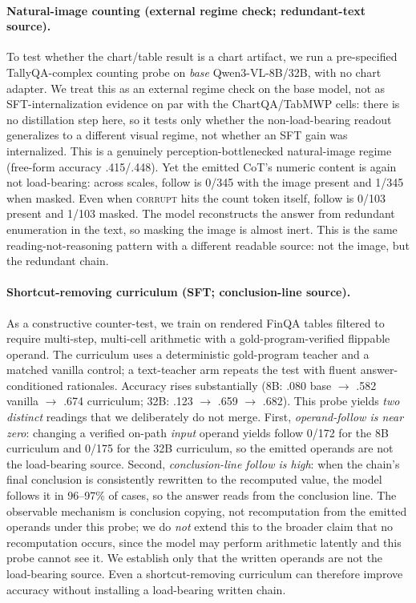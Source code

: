 \documentclass[11pt]{article}
\newcommand{\corrupt}{\textsc{corrupt}}
\begin{document}
\paragraph{Natural-image counting (external regime check; redundant-text source).}
To test whether the chart/table result is a chart artifact, we run a pre-specified TallyQA-complex counting probe on \emph{base} Qwen3-VL-8B/32B, with no chart adapter. We treat this as an external regime check on the base model, not as SFT-internalization evidence on par with the ChartQA/TabMWP cells: there is no distillation step here, so it tests only whether the non-load-bearing readout generalizes to a different visual regime, not whether an SFT gain was internalized. This is a genuinely perception-bottlenecked natural-image regime (free-form accuracy .415/.448). Yet the emitted CoT's numeric content is again not load-bearing: across scales, follow is 0/345 with the image present and 1/345 when masked. Even when \corrupt{} hits the count token itself, follow is 0/103 present and 1/103 masked. The model reconstructs the answer from redundant enumeration in the text, so masking the image is almost inert. This is the same reading-not-reasoning pattern with a different readable source: not the image, but the redundant chain.

\paragraph{Shortcut-removing curriculum (SFT; conclusion-line source).}
As a constructive counter-test, we train on rendered FinQA tables filtered to require multi-step, multi-cell arithmetic with a gold-program-verified flippable operand. The curriculum uses a deterministic gold-program teacher and a matched vanilla control; a text-teacher arm repeats the test with fluent answer-conditioned rationales. Accuracy rises substantially (8B: .080 base $\to$ .582 vanilla $\to$ .674 curriculum; 32B: .123 $\to$ .659 $\to$ .682). This probe yields \emph{two distinct} readings that we deliberately do not merge. First, \emph{operand-follow is near zero}: changing a verified on-path \emph{input} operand yields follow 0/172 for the 8B curriculum and 0/175 for the 32B curriculum, so the emitted operands are not the load-bearing source. Second, \emph{conclusion-line follow is high}: when the chain's final conclusion is consistently rewritten to the recomputed value, the model follows it in 96--97\% of cases, so the answer reads from the conclusion line. The observable mechanism is conclusion copying, not recomputation from the emitted operands under this probe; we do \emph{not} extend this to the broader claim that no recomputation occurs, since the model may perform arithmetic latently and this probe cannot see it. We establish only that the written operands are not the load-bearing source. Even a shortcut-removing curriculum can therefore improve accuracy without installing a load-bearing written chain.
\end{document}
